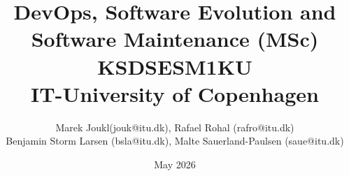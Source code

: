 \documentclass{article}
\begin{document}
\title{DevOps, Software Evolution and Software Maintenance (MSc) \\ KSDSESM1KU \\ IT-University of Copenhagen}
\author{Marek Joukl(jouk@itu.dk), Rafael Rohal (rafro@itu.dk) \\ Benjamin Storm Larsen (bsla@itu.dk), Malte Sauerland-Paulsen (saue@itu.dk)}
\date{May 2026}
\maketitle
\newpage







\newpage
\appendix{}

\end{document}
